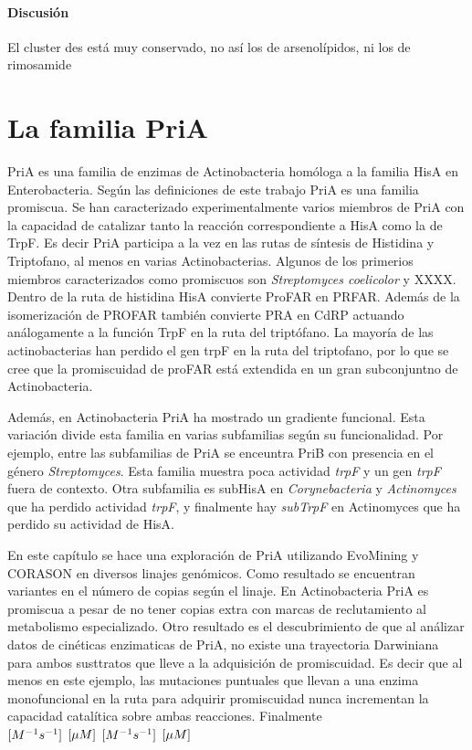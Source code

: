 \documentclass[12pt,twoside]{reedthesis}
\begin{document}
  \subsubsection{Discusión}\label{discusion}
  
  El cluster des está muy conservado, no así los de arsenolípidos, ni los
  de rimosamide
  
  \hypertarget{ref_labels}{\chapter{La familia PriA}\label{ref_labels}}
  
  PriA es una familia de enzimas de Actinobacteria homóloga a la familia
  HisA en Enterobacteria. Según las definiciones de este trabajo PriA es
  una familia promiscua. Se han caracterizado experimentalmente varios
  miembros de PriA con la capacidad de catalizar tanto la reacción
  correspondiente a HisA como la de TrpF. Es decir PriA participa a la vez
  en las rutas de síntesis de Histidina y Triptofano, al menos en varias
  Actinobacterias. Algunos de los primerios miembros caracterizados como
  promiscuos son \emph{Streptomyces coelicolor} y XXXX. Dentro de la ruta
  de histidina HisA convierte ProFAR en PRFAR. Además de la isomerización
  de PROFAR también convierte PRA en CdRP actuando análogamente a la
  función TrpF en la ruta del triptófano. La mayoría de las
  actinobacterias han perdido el gen trpF en la ruta del triptofano, por
  lo que se cree que la promiscuidad de proFAR está extendida en un gran
  subconjuntno de Actinobacteria.
  
  Además, en Actinobacteria PriA ha mostrado un gradiente funcional. Esta
  variación divide esta familia en varias subfamilias según su
  funcionalidad. Por ejemplo, entre las subfamilias de PriA se enceuntra
  PriB con presencia en el género \emph{Streptomyces}. Esta familia
  muestra poca actividad \emph{trpF} y un gen \emph{trpF} fuera de
  contexto. Otra subfamilia es subHisA en \emph{Corynebacteria} y
  \emph{Actinomyces} que ha perdido actividad \emph{trpF}, y finalmente
  hay \emph{subTrpF} en Actinomyces que ha perdido su actividad de HisA.
  
  En este capítulo se hace una exploración de PriA utilizando EvoMining y
  CORASON en diversos linajes genómicos. Como resultado se encuentran
  variantes en el número de copias según el linaje. En Actinobacteria PriA
  es promiscua a pesar de no tener copias extra con marcas de
  reclutamiento al metabolismo especializado. Otro resultado es el
  descubrimiento de que al análizar datos de cinéticas enzimaticas de
  PriA, no existe una trayectoria Darwiniana para ambos susttratos que
  lleve a la adquisición de promiscuidad. Es decir que al menos en este
  ejemplo, las mutaciones puntuales que llevan a una enzima monofuncional
  en la ruta para adquirir promiscuidad nunca incrementan la capacidad
  catalítica sobre ambas reacciones. Finalmente\\
  \textbar{}\textbar{}\textbar{}\textbar{}\(\tiny[M^{-1}s^{-1}]\)
  \textbar{}\(\tiny[\mu M]\)\textbar{} \textbar{}\(\tiny[M^{-1}s^{-1}]\)
  \textbar{}\(\tiny[\mu M]\)\textbar{}\textbar{}\textbar{}
  
\end{document}
